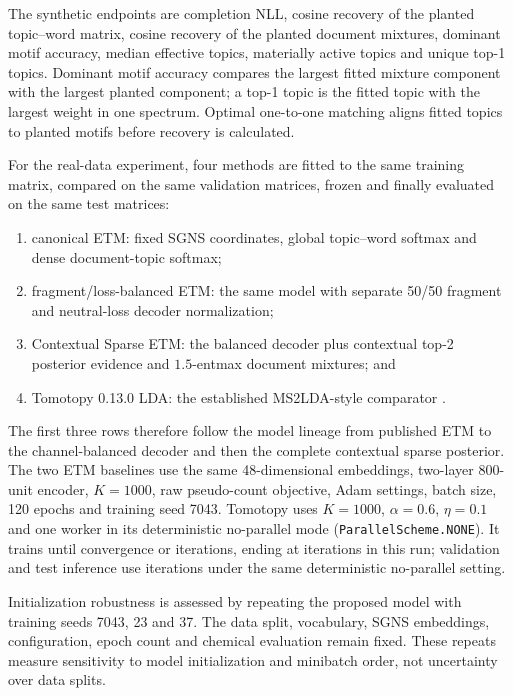 \documentclass[10pt,a4paper]{article}
\begin{document}
The synthetic endpoints are completion NLL, cosine recovery of the planted
topic--word matrix, cosine recovery of the planted document mixtures, dominant
motif accuracy, median effective topics, materially active topics and unique
top-1 topics. Dominant motif accuracy compares the largest fitted mixture
component with the largest planted component; a top-1 topic is the fitted topic
with the largest weight in one spectrum. Optimal one-to-one matching aligns
fitted topics to planted motifs before recovery is calculated.

For the real-data experiment, four methods are fitted to the same training
matrix, compared on the same validation matrices, frozen and finally evaluated
on the same test matrices:
\begin{enumerate}
  \item canonical ETM: fixed SGNS coordinates, global topic--word softmax and
  dense document-topic softmax;
  \item fragment/loss-balanced ETM: the same model with separate 50/50
  fragment and neutral-loss decoder normalization;
  \item Contextual Sparse ETM: the balanced decoder plus contextual top-2
  posterior evidence and $1.5$-entmax document mixtures; and
  \item Tomotopy 0.13.0 LDA: the established MS2LDA-style comparator
  \cite{tomotopy}.
\end{enumerate}
The first three rows therefore follow the model lineage from published ETM to
the channel-balanced decoder and then the complete contextual sparse posterior.
The two ETM baselines use the same 48-dimensional embeddings, two-layer
800-unit encoder, $K=1000$, raw pseudo-count objective, Adam settings, batch
size, 120 epochs and training seed 7043. Tomotopy uses $K=1000$,
$\alpha=0.6$, $\eta=0.1$ and one worker in its deterministic no-parallel
mode (\texttt{ParallelScheme.NONE}). It trains until convergence or
\TomotopyMaximumIterations{} iterations, ending at
\TomotopyTrainingIterations{} iterations in this run; validation and test
inference use \TomotopyInferenceIterations{} iterations under the same
deterministic no-parallel setting.

Initialization robustness is assessed by repeating the proposed model with
training seeds 7043, 23 and 37. The data split, vocabulary, SGNS embeddings,
configuration, epoch count and chemical evaluation remain fixed. These repeats
measure sensitivity to model initialization and minibatch order, not uncertainty
over data splits.
\end{document}

